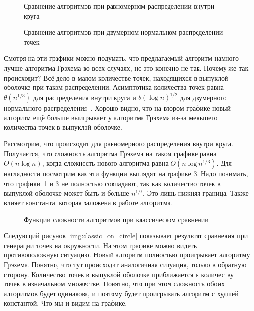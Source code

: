 \begin{figure}
	\centering
	
	\caption{Сравнение алгоритмов при равномерном распределении внутри круга}
	\label{img:classic_in_circle}
\end{figure}

\begin{figure}
	\centering
	
	\caption{Сравнение алгоритмов при двумерном нормальном распределении точек}
	\label{img:classic_gauss}
\end{figure}

Смотря на эти графики можно подумать, что предлагаемый алгоритм намного лучше алгоритма Грэхема во всех случаях, но это конечно не так. Почему же так происходит? Всё дело в малом количестве точек, находящихся в выпуклой оболочке при таком распределении. Асимптотика количества точек равна $\theta( n^{1/3} )$ для распределения внутри круга и $\theta{(\log n)^{1/2}}$ для двумерного нормального распределения~\cite{algolist2010convexhull}. Хорошо видно, что на втором графике новый алгоритм ещё больше выигрывает у алгоритма Грэхема из-за меньшего количества точек в выпуклой оболочке.

Рассмотрим, что происходит для равномерного распределения внутри круга. Получается, что сложность алгоритма Грэхема на таком графике равна $O(n \log{n})$, когда сложность нового алгоритма равна $O(n \log{n^{1/3}})$. Для наглядности посмотрим как эти функции выглядят на графике \ref{img:charts_comparison}. Надо понимать, что графики~\ref{img:classic_in_circle} и \ref{img:charts_comparison} не полностью совпадают, так как количество точек в выпуклой оболочке может быть и больше $n^{1/3}$. Это лишь нижняя граница. Также влияет константа, которая заложена в работе алгоритма.

\begin{figure}[hbt]
	\centering
	
	\caption{Функции сложности алгоритмов при классическом сравнении}
	\label{img:charts_comparison}
\end{figure}

Следующий рисунок \ref{img:classic_on_circle} показывает результат сравнения при генерации точек на окружности. На этом графике можно видеть противоположную ситуацию. Новый алгоритм полностью проигрывает алгоритму Грэхема. Понятно, что тут происходит аналогичная ситуация, только в обратную сторону. Количество точек в выпуклой оболочке приближается к количеству точек в изначальном множестве. Понятно, что при этом сложность обоих алгоритмов будет одинакова, и поэтому будет проигрывать алгоритм с худшей константой. Что мы и видим на графике.

